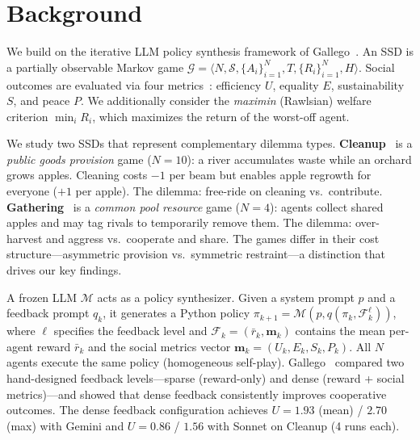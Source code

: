 \documentclass[sigconf,authordraft]{acmart}
\newcommand{\cM}{\mathcal{M}}
\newcommand{\cG}{\mathcal{G}}
\newcommand{\bm}{\mathbf{m}}
\begin{document}


\maketitle

\section{Background}

We build on the iterative LLM policy synthesis framework of Gallego~\cite{gallego2026}. An SSD is a partially observable Markov game $\cG = \langle N, \mathcal{S}, \{A_i\}_{i=1}^{N}, T, \{R_i\}_{i=1}^{N}, H \rangle$. Social outcomes are evaluated via four metrics~\cite{perolat2017}: efficiency $U$, equality $E$, sustainability $S$, and peace $P$. We additionally consider the \emph{maximin} (Rawlsian) welfare criterion $\min_i R_i$, which maximizes the return of the worst-off agent.

We study two SSDs that represent complementary dilemma types. \textbf{Cleanup}~\cite{hughes2018} is a \emph{public goods provision} game ($N{=}10$): a river accumulates waste while an orchard grows apples. Cleaning costs $-1$ per beam but enables apple regrowth for everyone ($+1$ per apple). The dilemma: free-ride on cleaning vs.\ contribute. \textbf{Gathering}~\cite{leibo2017,perolat2017} is a \emph{common pool resource} game ($N{=}4$): agents collect shared apples and may tag rivals to temporarily remove them. The dilemma: over-harvest and aggress vs.\ cooperate and share. The games differ in their cost structure---asymmetric provision vs.\ symmetric restraint---a distinction that drives our key findings.

A frozen LLM $\cM$ acts as a policy synthesizer. Given a system prompt $p$ and a feedback prompt $q_k$, it generates a Python policy $\pi_{k+1} = \cM(p, q(\pi_k, \mathcal{F}_k^\ell))$, where $\ell$ specifies the feedback level and $\mathcal{F}_k = (\bar{r}_k, \bm_k)$ contains the mean per-agent reward $\bar{r}_k$ and the social metrics vector $\bm_k = (U_k, E_k, S_k, P_k)$. All $N$ agents execute the same policy (homogeneous self-play). Gallego~\cite{gallego2026} compared two hand-designed feedback levels---sparse (reward-only) and dense (reward + social metrics)---and showed that dense feedback consistently improves cooperative outcomes. The dense feedback configuration achieves $U{=}1.93$ (mean) / $2.70$ (max) with Gemini and $U{=}0.86$ / $1.56$ with Sonnet on Cleanup (4 runs each).
\end{document}
